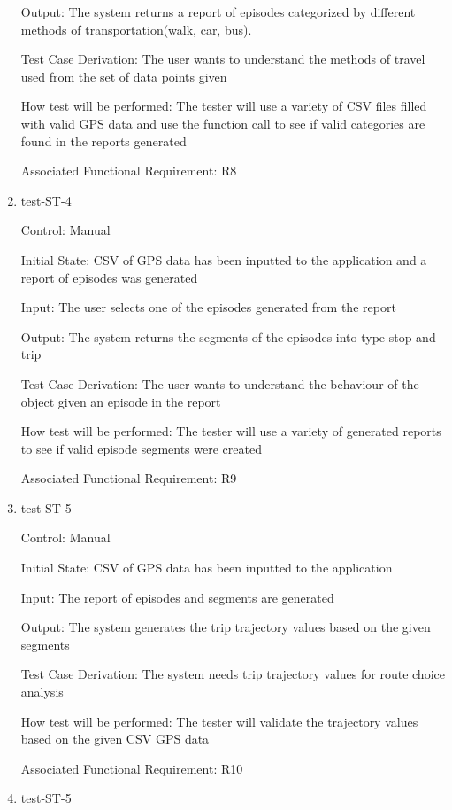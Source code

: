 \documentclass[12pt, titlepage]{article}
\begin{document}
\begin{enumerate}
Output: The system returns a report of episodes categorized by different  methods of transportation(walk, car, bus).

Test Case Derivation: The user wants to understand the methods of travel used from the set of data points given

How test will be performed: The tester will use a variety of CSV files filled with valid GPS data and use the function call to see if valid categories are found in the reports generated


Associated Functional Requirement: R8


\item{test-ST-4\\}

Control: Manual
					
Initial State: CSV of GPS data has been inputted to the application and a report of episodes was generated 
					
Input: The user selects one of the episodes generated from the report
					
Output: The system returns the segments of the episodes into type stop and trip 

Test Case Derivation: The user wants to understand the behaviour of the object given an episode in the report

How test will be performed: The tester will use a variety of generated reports to see if valid episode segments were created 


Associated Functional Requirement: R9


\item{test-ST-5\\}

Control: Manual
					
Initial State: CSV of GPS data has been inputted to the application 
					
Input: The report of episodes and segments are generated
					
Output: The system generates the trip trajectory values based on the given segments

Test Case Derivation: The system needs trip trajectory values for route choice analysis

How test will be performed: The tester will validate the trajectory values based on the given CSV GPS data 

Associated Functional Requirement: R10

\item{test-ST-5\\}


\end{enumerate}
\end{document}

